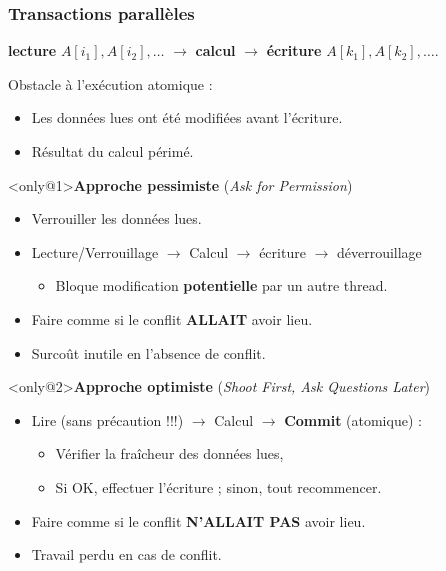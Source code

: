 \documentclass[xcolor={x11names,svgnames},x11names,svgnames]{beamer}
\begin{document}
\begin{frame}[label=transactions]
  \frametitle{Transactions parallèles}

  \textbf{lecture} $A[i_1], A[i_2], \dots$ $\rightarrow$ \textbf{calcul} $\rightarrow$ \textbf{écriture} $A[k_1], A[k_2], \dots$.

  \medskip

  \begin{block}{Obstacle à l'exécution \og atomique\fg{} :}
    \begin{itemize}
    \item Les données lues ont été modifiées avant l'écriture.
    \item Résultat du calcul \og périmé\fg{}.
    \end{itemize}
  \end{block}
  
  \begin{overlayarea}{\textwidth}{4cm}
  \begin{alertblock}<only@1>{\textbf{Approche pessimiste} (\og \textit{Ask for Permission}\fg{})}
    \begin{itemize}
    \item \og Verrouiller\fg{} les données lues.
    \item Lecture/Verrouillage $\rightarrow$ Calcul $\rightarrow$ écriture $\rightarrow$ déverrouillage
      \begin{itemize}
      \item Bloque modification \textbf{potentielle} par un autre thread.
      \end{itemize}
    \item Faire comme si le conflit \textbf{ALLAIT} avoir lieu.
    \item Surcoût inutile en l'absence de conflit.
    \end{itemize}
  \end{alertblock}

  \begin{exampleblock}<only@2>{\textbf{Approche optimiste} (\og \textit{Shoot First, Ask Questions Later}\fg{})}
    \begin{itemize}
    \item Lire (\alert{sans précaution !!!}) $\rightarrow$ Calcul $\rightarrow$ \textbf{Commit} (atomique) :
      \begin{itemize}
      \item Vérifier la fraîcheur des données lues,
      \item Si OK, effectuer l'écriture ; sinon, tout recommencer.
      \end{itemize}
    \item Faire comme si le conflit \textbf{N'ALLAIT PAS} avoir lieu.
    \item Travail perdu en cas de conflit.
    \end{itemize}
  \end{exampleblock}    
\end{overlayarea}
\end{frame}
\end{document}
